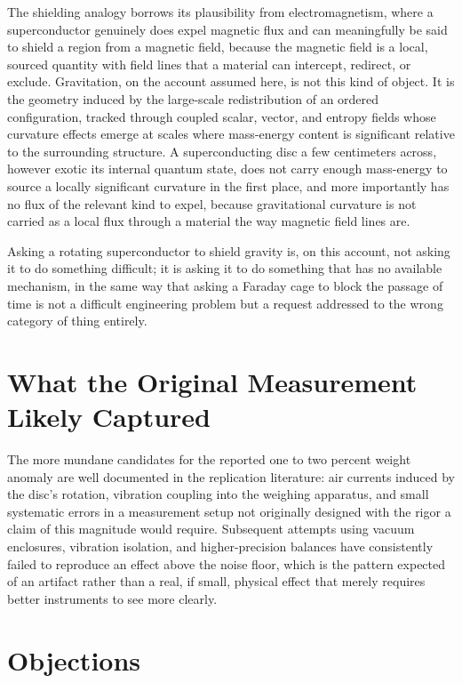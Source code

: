 \documentclass[11pt]{article}
\begin{document}
The shielding analogy borrows its plausibility from electromagnetism, where a superconductor genuinely does expel magnetic flux and can meaningfully be said to shield a region from a magnetic field, because the magnetic field is a local, sourced quantity with field lines that a material can intercept, redirect, or exclude. Gravitation, on the account assumed here, is not this kind of object. It is the geometry induced by the large-scale redistribution of an ordered configuration, tracked through coupled scalar, vector, and entropy fields whose curvature effects emerge at scales where mass-energy content is significant relative to the surrounding structure. A superconducting disc a few centimeters across, however exotic its internal quantum state, does not carry enough mass-energy to source a locally significant curvature in the first place, and more importantly has no flux of the relevant kind to expel, because gravitational curvature is not carried as a local flux through a material the way magnetic field lines are.

Asking a rotating superconductor to shield gravity is, on this account, not asking it to do something difficult; it is asking it to do something that has no available mechanism, in the same way that asking a Faraday cage to block the passage of time is not a difficult engineering problem but a request addressed to the wrong category of thing entirely.

\section{What the Original Measurement Likely Captured}

The more mundane candidates for the reported one to two percent weight anomaly are well documented in the replication literature: air currents induced by the disc's rotation, vibration coupling into the weighing apparatus, and small systematic errors in a measurement setup not originally designed with the rigor a claim of this magnitude would require. Subsequent attempts using vacuum enclosures, vibration isolation, and higher-precision balances have consistently failed to reproduce an effect above the noise floor, which is the pattern expected of an artifact rather than a real, if small, physical effect that merely requires better instruments to see more clearly.

\section{Objections}
\end{document}
